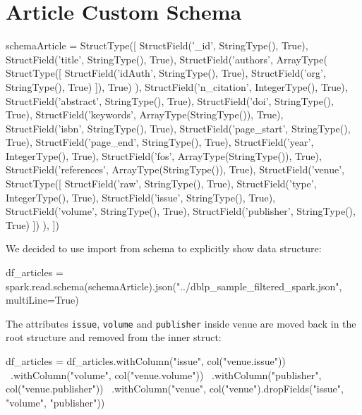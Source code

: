 \documentclass{Configuration_Files/PoliMi3i_thesis}
\begin{document}
\section{Article Custom Schema}
\begin{python}
schemaArticle = StructType([
    StructField('_id', StringType(), True),
    StructField('title', StringType(), True),
    StructField('authors',
        ArrayType(
        StructType([
            StructField('idAuth', StringType(), True),
            StructField('org', StringType(), True)
        ]), True)
    ),
    StructField('n_citation', IntegerType(), True),
    StructField('abstract', StringType(), True),
    StructField('doi', StringType(), True),
    StructField('keywords', ArrayType(StringType()), True),
    StructField('isbn', StringType(), True),
    StructField('page_start', StringType(), True),
    StructField('page_end', StringType(), True),
    StructField('year', IntegerType(), True),
    StructField('fos', ArrayType(StringType()), True),
    StructField('references', ArrayType(StringType()), True),
    StructField('venue',
        StructType([
            StructField('raw', StringType(), True),
            StructField('type', IntegerType(), True),
            StructField('issue', StringType(), True),
            StructField('volume', StringType(), True),
            StructField('publisher', StringType(), True)
        ])
    ),
])
\end{python}
\bigskip
We decided to use import from schema to explicitly show data structure:
\begin{python}
df_articles = spark.read.schema(schemaArticle).json("../dblp_sample_filtered_spark.json", multiLine=True)
\end{python}
\bigskip
The attributes \verb |issue|, \verb |volume| and \verb |publisher| inside venue are moved back in the root structure
and removed from the inner struct:
\begin{python}
df_articles = df_articles.withColumn("issue", col("venue.issue")) \
                        .withColumn("volume", col("venue.volume")) \
                        .withColumn("publisher", col("venue.publisher")) \
                        .withColumn("venue", col("venue").dropFields("issue", "volume", "publisher"))
\end{python}
\end{document}

